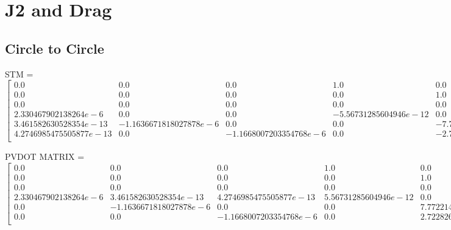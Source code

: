 \newpage
\FloatBarrier
\section{J2 and Drag}

\subsection{Circle to Circle}

STM = 
\begin{equation}
    \left[
    \begin{array}{cccccc}
    0.0 & 0.0 & 0.0 & 1.0 & 0.0 & 0.0 \\
    0.0 & 0.0 & 0.0 & 0.0 & 1.0 & 0.0 \\
    0.0 & 0.0 & 0.0 & 0.0 & 0.0 & 1.0 \\
    2.330467902138264e-6 & 0.0 & 0.0 & -5.56731285604946e-12 & 0.0 & 0.0 \\
    3.461582630528354e-13 & -1.1636671818027878e-6 & 0.0 & 0.0 & -7.772214569467844e-12 & -2.7228268563396247e-12 \\
    4.2746985475505877e-13 & 0.0 & -1.1668007203354768e-6 & 0.0 & -2.722826856339625e-12 & -8.929723998680535e-12 \\
    \end{array}
    \right]
\end{equation}

PVDOT MATRIX = 
\begin{equation}
    \left[
    \begin{array}{cccccc}
    0.0 & 0.0 & 0.0 & 1.0 & 0.0 & 0.0 \\
    0.0 & 0.0 & 0.0 & 0.0 & 1.0 & 0.0 \\
    0.0 & 0.0 & 0.0 & 0.0 & 0.0 & 1.0 \\
    2.330467902138264e-6 & 3.461582630528354e-13 & 4.2746985475505877e-13 & 5.56731285604946e-12 & 0.0 & 0.0 \\
    0.0 & -1.1636671818027878e-6 & 0.0 & 0.0 & 7.772214569467844e-12 & 2.722826856339625e-12 \\
    0.0 & 0.0 & -1.1668007203354768e-6 & 0.0 & 2.7228268563396247e-12 & 8.929723998680535e-12 \\
    \end{array}
    \right]
\end{equation}

